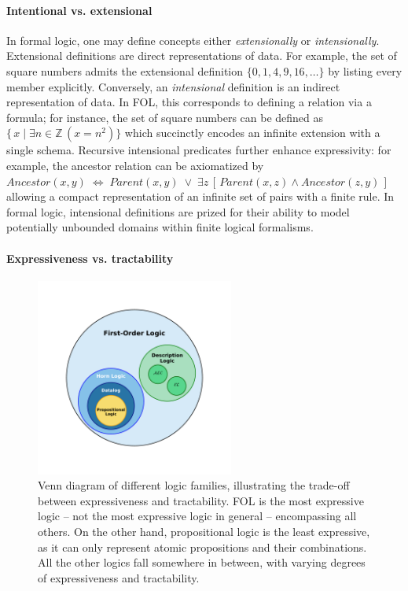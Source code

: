 \paragraph{Intentional vs. extensional}
%
In formal logic, one may define concepts either \emph{extensionally} or \emph{intensionally}.
%
Extensional definitions are direct representations of data.
%
For example, the set of square numbers admits the extensional definition $\{0,1,4,9,16,\dots\}$ by listing every member explicitly.
%
Conversely, an \emph{intensional} definition is an indirect representation of data.
%
In \gls{FOL}, this corresponds to defining a relation via a formula; for instance, the set of square numbers can be defined as $\{\,x\mid \exists n\in\mathbb{Z}\,(x = n^2)\}$ which succinctly encodes an infinite extension with a single schema.
%
Recursive intensional predicates further enhance expressivity: for example, the ancestor relation can be axiomatized by $\mathit{Ancestor}(x,y)\;\Leftrightarrow\;\mathit{Parent}(x,y)\;\lor\;\exists z\,[\,\mathit{Parent}(x,z)\wedge\mathit{Ancestor}(z,y)\,]$ allowing a compact representation of an infinite set of pairs with a finite rule.
%
In formal logic, intensional definitions are prized for their ability to model potentially unbounded domains within finite logical formalisms.


\paragraph{Expressiveness vs. tractability}
%
\begin{figure}
    \centering
    \includegraphics[width=0.58\textwidth]{figures/venn_diagram_logics}
    \caption[Venn diagram of different logic families]{
        Venn diagram of different logic families, illustrating the trade-off between expressiveness and tractability.
        \Gls{FOL} is the most expressive logic -- not the most expressive logic in general -- encompassing all others.
        On the other hand, propositional logic is the least expressive, as it can only represent atomic propositions and their combinations.
        All the other logics fall somewhere in between, with varying degrees of expressiveness and tractability.
    }
    \label{fig:venn-diagram-logics}
\end{figure}

